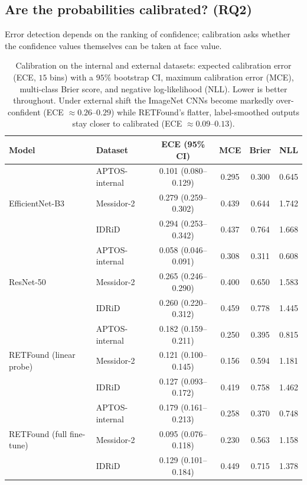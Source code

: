 \documentclass[journal]{IEEEtran}
\renewcommand{\_}{\origunderscore\allowbreak}
\begin{document}
\subsection{Are the probabilities calibrated? (RQ2)}
\label{sec:results-calib}

Error detection depends on the ranking of confidence; calibration asks whether
the confidence values themselves can be taken at face value.

\begin{table}[!t]
\centering\small
\caption{Calibration on the internal and external datasets: expected calibration
error (ECE, $15$ bins) with a $95\%$ bootstrap CI, maximum calibration error
(MCE), multi-class Brier score, and negative log-likelihood (NLL). Lower is
better throughout. Under external shift the ImageNet CNNs become markedly
over-confident (ECE $\approx 0.26$--$0.29$) while RETFound's flatter,
label-smoothed outputs stay closer to calibrated (ECE $\approx 0.09$--$0.13$).}
\label{tab:calib}
\setlength{\tabcolsep}{4pt}
\begin{tabular}{llcccc}
\toprule
Model & Dataset & ECE (95\% CI) & MCE & Brier & NLL \\
\midrule
\multirow{3}{*}{EfficientNet-B3}
 & APTOS-internal & 0.101 (0.080--0.129) & 0.295 & 0.300 & 0.645 \\
 & Messidor-2     & 0.279 (0.259--0.302) & 0.439 & 0.644 & 1.742 \\
 & IDRiD          & 0.294 (0.253--0.342) & 0.437 & 0.764 & 1.668 \\
\midrule
\multirow{3}{*}{ResNet-50}
 & APTOS-internal & 0.058 (0.046--0.091) & 0.308 & 0.311 & 0.608 \\
 & Messidor-2     & 0.265 (0.246--0.290) & 0.400 & 0.650 & 1.583 \\
 & IDRiD          & 0.260 (0.220--0.312) & 0.459 & 0.778 & 1.445 \\
\midrule
\multirow{3}{*}{RETFound (linear probe)}
 & APTOS-internal & 0.182 (0.159--0.211) & 0.250 & 0.395 & 0.815 \\
 & Messidor-2     & 0.121 (0.100--0.145) & 0.156 & 0.594 & 1.181 \\
 & IDRiD          & 0.127 (0.093--0.172) & 0.419 & 0.758 & 1.462 \\
\midrule
\multirow{3}{*}{RETFound (full fine-tune)}
 & APTOS-internal & 0.179 (0.161--0.213) & 0.258 & 0.370 & 0.748 \\
 & Messidor-2     & 0.095 (0.076--0.118) & 0.230 & 0.563 & 1.158 \\
 & IDRiD          & 0.129 (0.101--0.184) & 0.449 & 0.715 & 1.378 \\
\bottomrule
\end{tabular}
\end{table}
\end{document}
